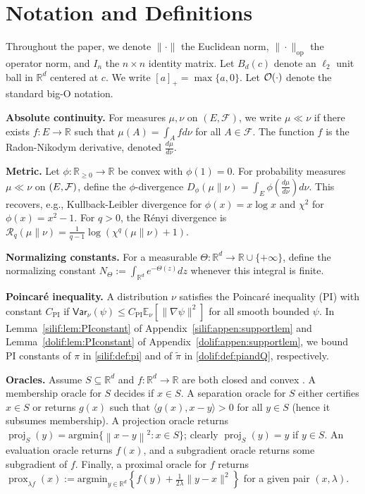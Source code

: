 \documentclass[11pt,letterpaper]{article}
\newcommand{\R}{\mathbb{R}}
\newcommand{\norm}[1]{\left\lVert #1 \right\rVert}
\newcommand{\E}{\mathbb{E}}
\newcommand{\proj}{\operatorname{proj}}
\newcommand{\prox}{\operatorname{prox}}
\newcommand{\argmin}{\mathrm{argmin}  }
\newcommand{\Var}{\mathsf{Var}}
\begin{document}
\section{Notation and Definitions}
\label{sec:prelim}
Throughout the paper, we denote $\|\cdot\|$ the Euclidean norm, $\|\cdot\|_{\mathrm{op}}$ the operator norm, and $I_n$ the $n\times n$ identity matrix. Let $B_d(c)$ denote an $\ell_2$ unit ball in $\R^d$ centered at $c$. We write $[a]_+=\max\{a,0\}$. Let ${\cal O}(\cdot)$ denote the standard big-O notation.

\textbf{Absolute continuity.} For measures $\mu,\nu$ on $(E,\mathcal{F})$, we write $\mu\ll\nu$ if there exists $f:E\to\R$ such that $\mu(A)=\int_A f d\nu$ for all $A\in\mathcal{F}$. The function $f$ is the Radon-Nikodym derivative, denoted $\frac{d\mu}{d\nu}$.

\textbf{Metric.} Let $\phi:\R_{\ge0}\to\R$ be convex with $\phi(1)=0$. For probability measures $\mu\ll\nu$ on $(E,\cal F)$, define the $\phi$-divergence
$D_\phi(\mu\|\nu)=\int_E \phi \left(\frac{d\mu}{d\nu}\right) d\nu$.
This recovers, e.g., Kullback-Leibler divergence for $\phi(x)=x\log x$ and $\chi^2$ for $\phi(x)=x^2-1$.
For $q>0$, the Rényi divergence is $\mathcal{R}_q(\mu\|\nu)=\frac{1}{q-1}\log \left(\chi^q(\mu\|\nu)+1\right)$.


\textbf{Normalizing constants.} 
For a measurable $\Theta:\R^d\to\R\cup\{+\infty\}$, define the normalizing constant $N_\Theta:=\int_{\R^d} e^{-\Theta(z)}dz$ whenever this integral is finite.


\textbf{Poincar\'e inequality.} A distribution $\nu$ satisfies the Poincar\'e inequality (PI) with constant $C_{\mathrm{PI}}$ if $\Var_\nu(\psi)\le C_{\mathrm{PI}}\E_\nu[\|\nabla\psi\|^2]$ for all smooth bounded $\psi$. In Lemma~\ref{silif:lem:PIconstant} of Appendix~\ref{silif:appen:supportlem} and Lemma~\ref{dolif:lem:PIconstant} of Appendix~\ref{dolif:appen:supportlem}, we bound PI constants of $\pi$ in \eqref{silif:def:pi} and of $\tilde{\pi}$ in \eqref{dolif:def:piandQ}, respectively. 

\textbf{Oracles.} Assume $S\subseteq \R^d$ and $f:\R^d\to\R$ are both closed and convex . A membership oracle for $S$ decides if $x\in S$. A separation oracle for $S$ either certifies $x\in S$ or returns $g(x)$ such that $\langle g(x),x-y\rangle >0$ for all $y\in S$ (hence it subsumes membership). A projection oracle returns $\proj_S(y)=\argmin\{\norm{x-y}^2: x\in S\}$; clearly $\proj_S(y)=y$ if $y\in S$.
An evaluation oracle returns $f(x)$, and a subgradient oracle returns some subgradient of $f$. Finally, a proximal oracle for $f$ returns $\prox_{\lambda f}(x):=\argmin_{y\in \R^d}\left\{f(y)+\frac{1}{2\lambda}\|y-x\|^2\right\}$ for a given pair $(x,\lambda)$. 
\end{document}
